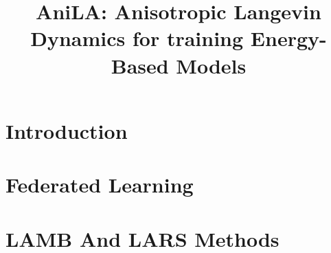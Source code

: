 \documentclass{article}
\begin{document}
\title{AniLA: Anisotropic Langevin Dynamics for training Energy-Based Models}


\date{}
\maketitle

\begin{abstract}
\end{abstract}

\section{Introduction}
\section{Federated Learning}

\section{LAMB And LARS Methods}

\newpage






\end{document}

